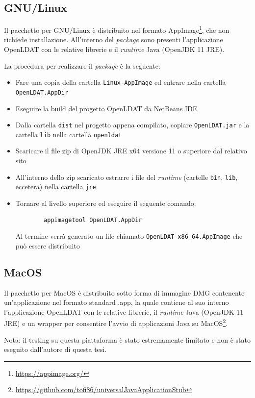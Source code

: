 \subsection{GNU/Linux}
Il pacchetto per GNU/Linux è distribuito nel formato AppImage\footnote{\url{https://appimage.org/}}, che non richiede installazione. All'interno del \textit{package} sono presenti l'applicazione OpenLDAT con le relative librerie e il \textit{runtime} Java (OpenJDK 11 JRE).

La procedura per realizzare il \textit{package} è la seguente:\begin{itemize}
	\item Fare una copia della cartella \texttt{Linux-AppImage} ed entrare nella cartella \texttt{OpenLDAT.AppDir}
	\item Eseguire la build del progetto OpenLDAT da NetBeans IDE
	\item Dalla cartella \texttt{dist} nel progetto appena compilato, copiare \texttt{OpenLDAT.jar} e la cartella \texttt{lib} nella cartella \texttt{openldat}
	\item Scaricare il file zip di OpenJDK JRE x64 versione 11 o superiore dal relativo sito
	\item All'interno dello zip scaricato estrarre i file del \textit{runtime} (cartelle \texttt{bin}, \texttt{lib}, eccetera) nella cartella \texttt{jre}
	\item Tornare al livello superiore ed eseguire il seguente comando:\begin{verbatim}
		appimagetool OpenLDAT.AppDir
	\end{verbatim}
	Al termine verrà generato un file chiamato \texttt{OpenLDAT-x86\_64.AppImage} che può essere distribuito
\end{itemize}

\subsection{MacOS}
Il pacchetto per MacOS è distribuito sotto forma di immagine DMG contenente un'applicazione nel formato standard .app, la quale contiene al suo interno l'applicazione OpenLDAT con le relative librerie, il \textit{runtime} Java (OpenJDK 11 JRE) e un wrapper per consentire l'avvio di applicazioni Java su MacOS\footnote{\url{https://github.com/tofi86/universalJavaApplicationStub}}.

Nota: il testing su questa piattaforma è stato estremamente limitato e non è stato eseguito dall'autore di questa tesi.

